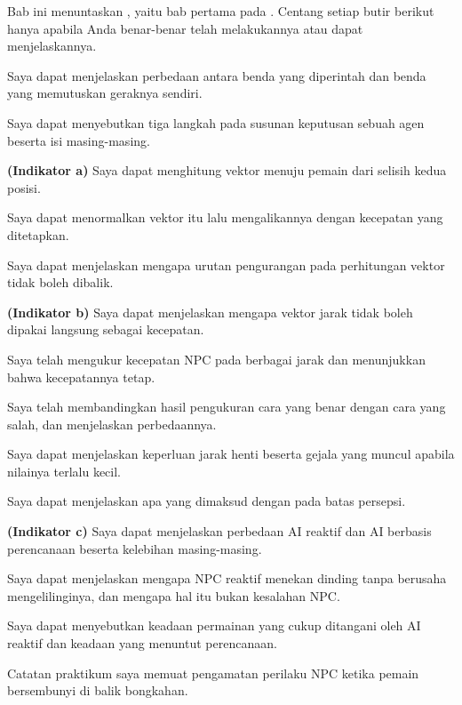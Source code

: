 
Bab ini menuntaskan , yaitu bab pertama pada . Centang
setiap butir berikut hanya apabila Anda benar-benar telah melakukannya atau
dapat menjelaskannya.

\begin{checklistbox}
\begin{checklist}
  \item Saya dapat menjelaskan perbedaan antara benda yang diperintah dan benda
        yang memutuskan geraknya sendiri.
  \item Saya dapat menyebutkan tiga langkah pada susunan keputusan sebuah agen
        beserta isi masing-masing.
  \item {\bfseries (Indikator a)} Saya dapat menghitung vektor menuju pemain
        dari selisih kedua posisi.
  \item Saya dapat menormalkan vektor itu lalu mengalikannya dengan kecepatan
        yang ditetapkan.
  \item Saya dapat menjelaskan mengapa urutan pengurangan pada perhitungan
        vektor tidak boleh dibalik.
  \item {\bfseries (Indikator b)} Saya dapat menjelaskan mengapa vektor jarak
        tidak boleh dipakai langsung sebagai kecepatan.
  \item Saya telah mengukur kecepatan NPC pada berbagai jarak dan menunjukkan
        bahwa kecepatannya tetap.
  \item Saya telah membandingkan hasil pengukuran cara yang benar dengan cara
        yang salah, dan menjelaskan perbedaannya.
  \item Saya dapat menjelaskan keperluan jarak henti beserta gejala yang muncul
        apabila nilainya terlalu kecil.
  \item Saya dapat menjelaskan apa yang dimaksud dengan 
        pada batas persepsi.
  \item {\bfseries (Indikator c)} Saya dapat menjelaskan perbedaan AI reaktif
        dan AI berbasis perencanaan beserta kelebihan masing-masing.
  \item Saya dapat menjelaskan mengapa NPC reaktif menekan dinding tanpa
        berusaha mengelilinginya, dan mengapa hal itu bukan kesalahan NPC.
  \item Saya dapat menyebutkan keadaan permainan yang cukup ditangani oleh AI
        reaktif dan keadaan yang menuntut perencanaan.
  \item Catatan praktikum saya memuat pengamatan perilaku NPC ketika pemain
        bersembunyi di balik bongkahan.
\end{checklist}
\end{checklistbox}
